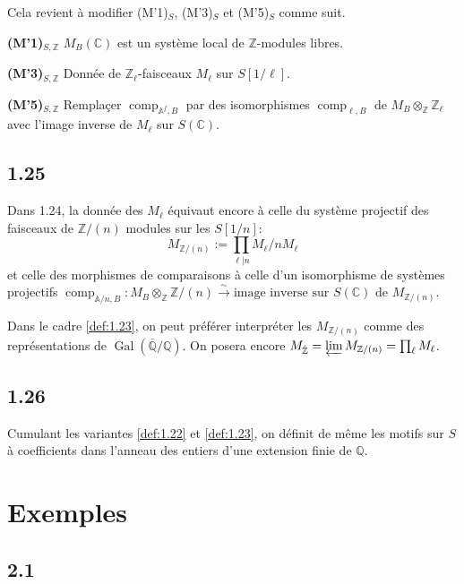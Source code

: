 \documentclass[12pt,a4paper]{article}
\theoremstyle{plain}
\theoremstyle{definition}
\theoremstyle{remark}
\DeclareMathOperator{\Gal}{Gal}
\providecommand{\Gal}{\operatorname{Gal}}
\providecommand{\limproj}{\varprojlim}
\providecommand{\comp}{\operatorname{comp}}
\begin{document}
Cela revient \`a modifier (M'1)$_S$, (M'3)$_S$ et (M'5)$_S$ comme suit.

\textbf{(M'1)$_{S,\mathbb{Z}}$} $M_B(\mathbb{C})$ est un syst\`eme local de
$\mathbb{Z}$-modules libres.

\textbf{(M'3)$_{S,\mathbb{Z}}$} Donn\'ee de $\mathbb{Z}_\ell$-faisceaux $M_\ell$ sur
$S[1/\ell]$.

\textbf{(M'5)$_{S,\mathbb{Z}}$} Rempla\c{c}er $\comp_{\mathbb{A}^f,B}$ par des
isomorphismes $\comp_{\ell,B}$ de $M_B \otimes_{\mathbb{Z}} \mathbb{Z}_\ell$ avec l'image
inverse de $M_\ell$ sur $S(\mathbb{C})$.

\subsection*{1.25}

Dans 1.24, la donn\'ee des $M_\ell$ \'equivaut encore \`a celle du syst\`eme projectif
des faisceaux de $\mathbb{Z}/(n)$ modules sur les $S[1/n]$:
\[
M_{\mathbb{Z}/(n)} := \prod_{\ell|n} M_\ell/nM_\ell
\]
et celle des morphismes de comparaisons \`a celle d'un isomorphisme de syst\`emes
projectifs $\comp_{\mathbb{A}/n,B}: M_B \otimes_{\mathbb{Z}} \mathbb{Z}/(n)
\xrightarrow{\sim} \text{image inverse sur } S(\mathbb{C}) \text{ de }
M_{\mathbb{Z}/(n)}$.

Dans le cadre \ref{def:1.23}, on peut pr\'ef\'erer interpr\'eter les
$M_{\mathbb{Z}/(n)}$ comme des repr\'esentations de $\Gal(\overline{\mathbb{Q}}/\mathbb{Q})$.
On posera encore $M_{\hat{\mathbb{Z}}} = \limproj M_{\mathbb{Z}/(n)} = \prod_\ell
M_\ell$.

\subsection*{1.26}

Cumulant les variantes \ref{def:1.22} et \ref{def:1.23}, on d\'efinit de m\^eme les
motifs sur $S$ \`a coefficients dans l'anneau des entiers d'une extension finie de
$\mathbb{Q}$.

\section{Exemples}\label{sec:2}

\subsection*{2.1}
\end{document}
